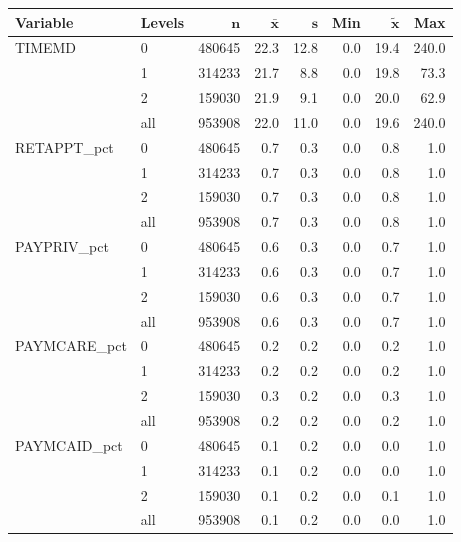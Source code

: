\begin{table}[ht]
\centering
{\footnotesize
\begin{tabular}{llrrrrrr}
 \textbf{Variable} & \textbf{Levels} & $\mathbf{n}$ & $\mathbf{\bar{x}}$ & $\mathbf{s}$ & \textbf{Min} & $\mathbf{\widetilde{x}}$ & \textbf{Max} \\ 
  \hline
TIMEMD & 0 & 480645 &   22.3 &   12.8 & 0.0 &   19.4 &  240.0 \\ 
   & 1 & 314233 &   21.7 &    8.8 & 0.0 &   19.8 &   73.3 \\ 
   & 2 & 159030 &   21.9 &    9.1 & 0.0 &   20.0 &   62.9 \\ 
   \hline
 & all & 953908 &   22.0 &   11.0 & 0.0 &   19.6 &  240.0 \\ 
   \hline
RETAPPT\_pct & 0 & 480645 &    0.7 &    0.3 & 0.0 &    0.8 &    1.0 \\ 
   & 1 & 314233 &    0.7 &    0.3 & 0.0 &    0.8 &    1.0 \\ 
   & 2 & 159030 &    0.7 &    0.3 & 0.0 &    0.8 &    1.0 \\ 
   \hline
 & all & 953908 &    0.7 &    0.3 & 0.0 &    0.8 &    1.0 \\ 
   \hline
PAYPRIV\_pct & 0 & 480645 &    0.6 &    0.3 & 0.0 &    0.7 &    1.0 \\ 
   & 1 & 314233 &    0.6 &    0.3 & 0.0 &    0.7 &    1.0 \\ 
   & 2 & 159030 &    0.6 &    0.3 & 0.0 &    0.7 &    1.0 \\ 
   \hline
 & all & 953908 &    0.6 &    0.3 & 0.0 &    0.7 &    1.0 \\ 
   \hline
PAYMCARE\_pct & 0 & 480645 &    0.2 &    0.2 & 0.0 &    0.2 &    1.0 \\ 
   & 1 & 314233 &    0.2 &    0.2 & 0.0 &    0.2 &    1.0 \\ 
   & 2 & 159030 &    0.3 &    0.2 & 0.0 &    0.3 &    1.0 \\ 
   \hline
 & all & 953908 &    0.2 &    0.2 & 0.0 &    0.2 &    1.0 \\ 
   \hline
PAYMCAID\_pct & 0 & 480645 &    0.1 &    0.2 & 0.0 &    0.0 &    1.0 \\ 
   & 1 & 314233 &    0.1 &    0.2 & 0.0 &    0.0 &    1.0 \\ 
   & 2 & 159030 &    0.1 &    0.2 & 0.0 &    0.1 &    1.0 \\ 
   \hline
 & all & 953908 &    0.1 &    0.2 & 0.0 &    0.0 &    1.0 \\ 

\end{tabular}}
\end{table}
